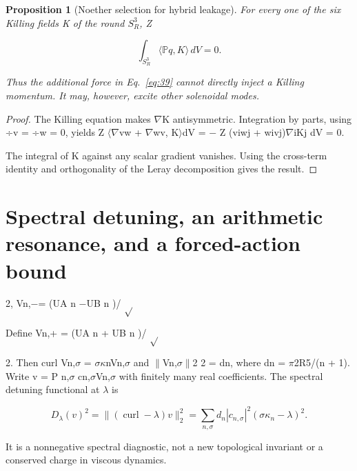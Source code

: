 \documentclass[10pt,letterpaper]{article}
\newtheorem{proposition}[theorem]{Proposition}
\theoremstyle{remark}
\begin{document}
\begin{proposition}[Noether selection for hybrid leakage]

For every one of the six Killing fields K of the round \(S_R^3\), Z


\begin{equation}
\tag{41}\label{eq:41}
\int_{S_R^3}\langle\mathbb Pq,K\rangle\,dV=0.
\end{equation}

Thus the additional force in Eq.~\eqref{eq:39} cannot directly inject a Killing momentum. It may, however, excite other solenoidal modes.


\end{proposition}

\begin{proof}
The Killing equation makes \(\nabla \)K antisymmetric. Integration by parts, using ÷v = ÷w = 0, yields Z \(\langle \nabla \)vw + \(\nabla \)wv, K\(\rangle \)dV = \(- \) Z (viwj + wivj)\(\nabla \)iKj dV = 0.

The integral of K against any scalar gradient vanishes. Using the cross-term identity and orthogonality of the Leray decomposition gives the result.


\end{proof}

\section{Spectral detuning, an arithmetic resonance, and a forced-action bound}


2, Vn,\(- \)= (UA n \(- \)UB n )/ \(\sqrt{} \)


Define Vn,+ = (UA n + UB n )/ \(\sqrt{} \)


2. Then curl Vn,\(\sigma \) = \(\sigma \kappa \)nVn,\(\sigma \) and \(\| \)Vn,\(\sigma \| \)2 2 = dn, where dn = \(\pi \)2R5/(n + 1). Write v = P n,\(\sigma \) cn,\(\sigma \)Vn,\(\sigma \) with finitely many real coefficients. The spectral detuning functional at \(\lambda \) is



\begin{equation}
\tag{42}\label{eq:42}
D_\lambda(v)^2=\|(\operatorname{curl}-\lambda)v\|_2^2=\sum_{n,\sigma}d_n|c_{n,\sigma}|^2(\sigma\kappa_n-\lambda)^2.
\end{equation}

It is a nonnegative spectral diagnostic, not a new topological invariant or a conserved charge in viscous dynamics.
\end{document}
